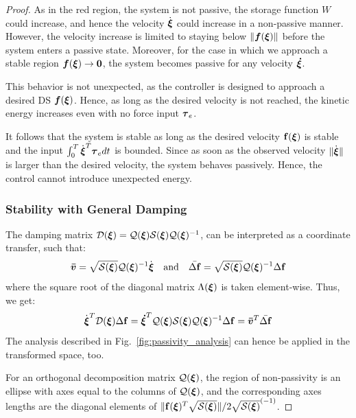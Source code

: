 \begin{proof}
As in the red region, the system is not passive, the storage function $W$ could increase, and hence the velocity $\dot {\boldsymbol{\xi}}$ could increase in a non-passive manner. However, the velocity increase is limited to staying below $\| \boldsymbol{f}({\boldsymbol{\xi}}) \|$ before the system enters a passive state. Moreover, for the case in which we approach a stable region $\boldsymbol{f}({\boldsymbol{\xi}}) \rightarrow \boldsymbol{0}$, the system becomes passive for any velocity $\boldsymbol{\boldsymbol{\dot \xi}}$.

This behavior is not unexpected, as the controller is designed to approach a desired DS $\boldsymbol{f}({\boldsymbol{\xi}})$. Hence, as long as the desired velocity is not reached, the kinetic energy increases even with no force input $\boldsymbol{\tau}_e$.

It follows that the system is stable as long as the desired velocity $\mathbf{f}({\boldsymbol{\xi}})$ is stable and the input $\int_{0}^T \dot{{\boldsymbol{\xi}}}^T \boldsymbol{\tau}_e dt$ is bounded. Since as soon as the observed velocity $\| \dot{{\boldsymbol{\xi}}} \| $ is larger than the desired velocity, the system behaves passively. Hence, the control cannot introduce unexpected energy.

\subsubsection{Stability with General Damping}
The damping matrix $\mathcal{D}({\boldsymbol{\xi}}) = \mathcal{Q}({\boldsymbol{\xi}}) \mathcal{S}({\boldsymbol{\xi}}) \mathcal{Q}({\boldsymbol{\xi}})^{-1}$, can be interpreted as a coordinate transfer, such that:
\begin{equation}
	\boldsymbol{\bar v} = \sqrt{\mathcal{S}({\boldsymbol{\xi}})} \mathcal{Q}({\boldsymbol{\xi}})^{-1} \dot{{\boldsymbol{\xi}}}
	\quad \text{and} \quad
	\bar{\Delta \mathbf f} = \sqrt{\mathcal{S}({\boldsymbol{\xi}})} \mathcal{Q}({\boldsymbol{\xi}})^{-1} \Delta \mathbf{f}
\end{equation}
where the square root of the diagonal matrix $\Lambda({\boldsymbol{\xi}})$ is taken element-wise. Thus, we get:
\begin{equation}
\dot{\boldsymbol{\xi}}^T \mathcal{D}({\boldsymbol{\xi}}) \Delta \mathbf{f} = \boldsymbol{\dot \xi}^T \mathcal{Q}({\boldsymbol{\xi}}) \mathcal{S}({\boldsymbol{\xi}}) \mathcal{Q}({\boldsymbol{\xi}})^{-1} \Delta \mathbf{f} = \boldsymbol{\bar v}^T \bar{\Delta \mathbf f}
\end{equation}
The analysis described in Fig.~\ref{fig:passivity_analysis} can hence be applied in the transformed space, too. 

For an orthogonal decomposition matrix $\mathcal{Q}(\boldsymbol{{\boldsymbol{\xi}}})$, the region of non-passivity is an ellipse with axes equal to the columns of $\mathcal{Q}({\boldsymbol{\xi}})$, and the corresponding axes lengths are the diagonal elements of $\| \mathbf{f}({\boldsymbol{\xi}})^T \sqrt{\mathcal{S}({\boldsymbol{\xi}})}\| / 2 \sqrt{\mathcal{S}({\boldsymbol{\xi}})}^{(-1)}$. 


\end{proof}
